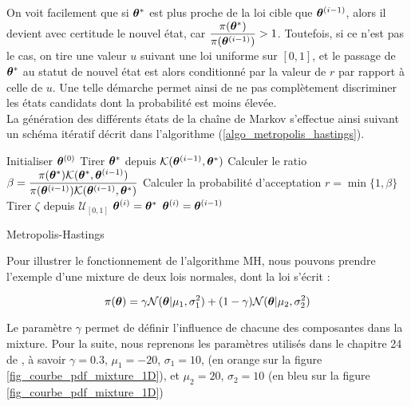 On voit facilement que si ${{\bm{\theta}}^*}$ est plus proche de la loi cible que ${{\bm{\theta}}^{(i-1)}}$, alors il devient avec certitude le nouvel état, car $\dfrac{\pi({{\bm{\theta}}^*})}{\pi({{\bm{\theta}}^{(i-1)}})} > 1$. Toutefois, si ce n'est pas le cas, on tire une valeur $u$ suivant une loi uniforme sur $[0,1]$, et le passage de ${{\bm{\theta}}^*}$ au statut de nouvel état est alors conditionné par la valeur de $r$ par rapport à celle de $u$. Une telle démarche permet ainsi de ne pas complètement discriminer les états candidats dont la probabilité est moins élevée. \\

La génération des différents états de la chaîne de Markov s'effectue ainsi suivant un schéma itératif décrit dans l'algorithme (\ref{algo_metropolis_hastings}). \\

\begin{algorithm}
	\begin{algorithmic}
		\State Initialiser ${\bm{\theta}}^{(0)}$
			\State Tirer ${{\bm{\theta}}^*}$ depuis ${\mathcal{K}}({{\bm{\theta}}^{(i-1)}}, {{\bm{\theta}}^*})$
			\State Calculer le ratio $\beta  =\dfrac{\pi({{\bm{\theta}}^*}){\mathcal{K}}({{\bm{\theta}}^*}, {{\bm{\theta}}^{(i-1)}})}{\pi({{\bm{\theta}}^{(i-1)}}){\mathcal{K}}({{\bm{\theta}}^{(i-1)}}, {{\bm{\theta}}^*})}$
			\State Calculer la probabilité d'acceptation $r  =\min\{1,\beta\} $
			\State Tirer $\zeta$ depuis $\mathcal{U}_{[0,1]}$
				\State ${{\bm{\theta}}^{(i)}} = {{\bm{\theta}}^*}$
				\Else
				\State ${{\bm{\theta}}^{(i)}} = {{\bm{\theta}}^{(i-1)}}$
			\EndIf
		\EndFor
	\end{algorithmic}
\caption{Metropolis-Hastings}
\label{algo_metropolis_hastings}
\end{algorithm}

Pour illustrer le fonctionnement de l'algorithme MH, nous pouvons prendre l'exemple d'une mixture de deux lois normales, dont la loi s'écrit : 

\begin{equation}
	\pi({\bm{\theta}}) = \gamma \mathcal{N}({\bm{\theta}} | \mu_1, \sigma_1^2) + (1-\gamma)\mathcal{N}({\bm{\theta}} | \mu_2, \sigma_2^2)
	\label{eq_mixture_2_gaussiennes_1D}
\end{equation}

Le paramètre $\gamma$ permet de définir l'influence de chacune des composantes dans la mixture. Pour la suite, nous reprenons les paramètres utilisés dans le chapitre 24 de  \cite{Murphy2012}, à savoir $\gamma = 0.3$, $\mu_1 = -20$, $\sigma_1 = 10$,  (en orange sur la figure \ref{fig_courbe_pdf_mixture_1D}), et $\mu_2 = 20$, $\sigma_2 = 10$ (en bleu sur la figure \ref{fig_courbe_pdf_mixture_1D})

